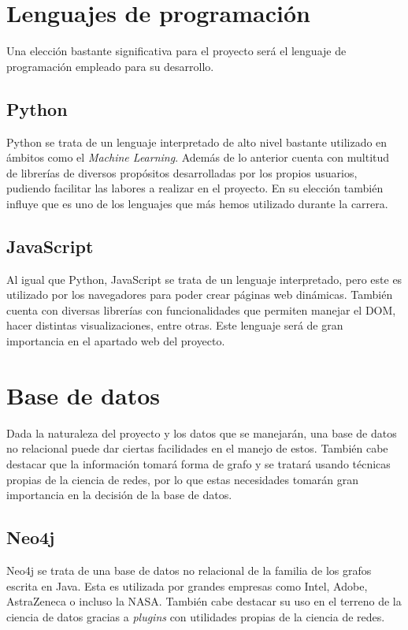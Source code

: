 \section{Lenguajes de programación}

Una elección bastante significativa para el proyecto será el lenguaje de programación empleado
para su desarrollo.
\subsection{Python}
Python se trata de un lenguaje interpretado de alto nivel bastante utilizado en ámbitos como el \textit{Machine Learning}.
Además de lo anterior cuenta con multitud de librerías de diversos propósitos desarrolladas por los propios usuarios, pudiendo
facilitar las labores a realizar en el proyecto. En su elección también influye que es uno de los lenguajes que más hemos
utilizado durante la carrera.
\subsection{JavaScript}
Al igual que Python, JavaScript se trata de un lenguaje interpretado, pero este es utilizado por los
navegadores para poder crear páginas web dinámicas. También cuenta con diversas librerías con funcionalidades
que permiten manejar el DOM, hacer distintas visualizaciones, entre otras. Este lenguaje será de gran importancia
en el apartado web del proyecto.

\section{Base de datos}

Dada la naturaleza del proyecto y los datos que se manejarán, una base de datos no relacional
puede dar ciertas facilidades en el manejo de estos. También cabe destacar que la información
tomará forma de grafo y se tratará usando técnicas propias de la ciencia de redes, por lo que 
estas necesidades tomarán gran importancia en la decisión de la base de datos.


\subsection{Neo4j}

Neo4j se trata de una base de datos no relacional de la familia de los grafos escrita en Java. Esta
es utilizada por grandes empresas como Intel, Adobe, AstraZeneca o incluso la NASA. También cabe destacar
su uso en el terreno de la ciencia de datos gracias a \textit{plugins} con utilidades propias de la ciencia de redes.


